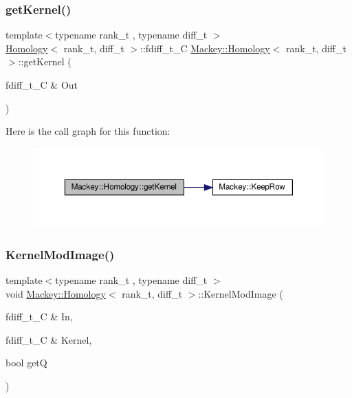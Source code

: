 \subsubsection{\texorpdfstring{get\+Kernel()}{getKernel()}}
{\footnotesize\ttfamily template$<$typename rank\+\_\+t , typename diff\+\_\+t $>$ \\
\hyperlink{classMackey_1_1Homology}{Homology}$<$ rank\+\_\+t, diff\+\_\+t $>$\+::fdiff\+\_\+t\+\_\+C \hyperlink{classMackey_1_1Homology}{Mackey\+::\+Homology}$<$ rank\+\_\+t, diff\+\_\+t $>$\+::get\+Kernel (\begin{DoxyParamCaption}\item[{fdiff\+\_\+t\+\_\+C \&}]{Out }\end{DoxyParamCaption})}

Here is the call graph for this function\+:\nopagebreak
\begin{figure}[H]
\begin{center}
\leavevmode
\includegraphics[width=350pt]{classMackey_1_1Homology_a72296e393c6f22a526375b0169daab94_cgraph}
\end{center}
\end{figure}
\mbox{\label{classMackey_1_1Homology_a902c8dfef7da8ad9f5e03d16eb60a423}} 
\subsubsection{\texorpdfstring{Kernel\+Mod\+Image()}{KernelModImage()}}
{\footnotesize\ttfamily template$<$typename rank\+\_\+t , typename diff\+\_\+t $>$ \\
void \hyperlink{classMackey_1_1Homology}{Mackey\+::\+Homology}$<$ rank\+\_\+t, diff\+\_\+t $>$\+::Kernel\+Mod\+Image (\begin{DoxyParamCaption}\item[{fdiff\+\_\+t\+\_\+C \&}]{In,  }\item[{fdiff\+\_\+t\+\_\+C \&}]{Kernel,  }\item[{bool}]{getQ }\end{DoxyParamCaption})}

